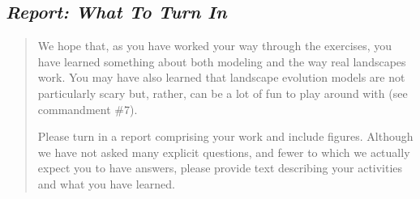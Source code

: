 \documentclass[12pt,reqno]{amsart}
\begin{document}
\subsection*{\em Report: What To Turn In}

\begin{quote}
\small
{\sf
We hope that, as you have worked your way through the exercises, you
have learned something about both modeling and the
way real landscapes work. You may have also learned that landscape
evolution models are not particularly scary but, rather, can be a lot
of fun to play around with (see commandment \#7). 

Please turn in a report comprising your work and include
figures. Although we have not asked 
many explicit questions, and fewer to which we actually expect you to
have answers, please provide text describing your activities and what
you have learned. 
}
\end{quote}

%
\end{document}
